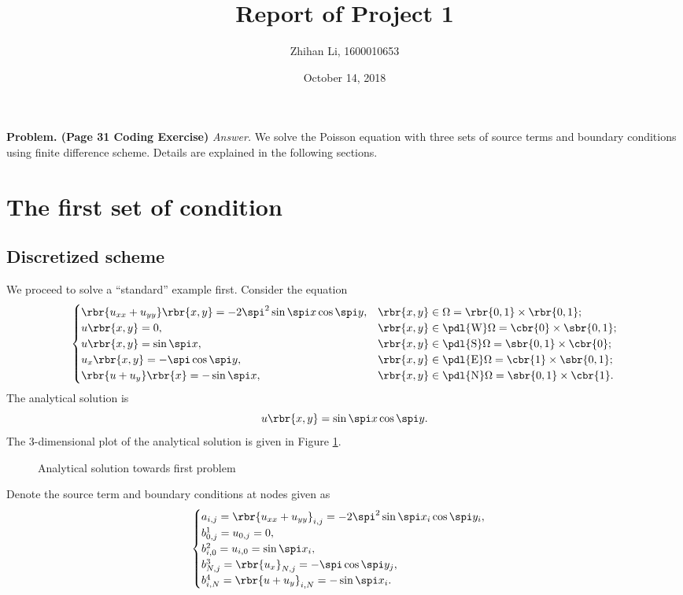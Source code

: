 \documentclass[english, nochinese]{pnote}
\title{Report of Project 1}
\author{Zhihan Li, 1600010653}
\date{October 14, 2018}
\begin{document}
\maketitle

\textbf{Problem. (Page 31 Coding Exercise)} \textit{Answer.} We solve the Poisson equation with three sets of source terms and boundary conditions using finite difference scheme. Details are explained in the following sections.

\section{The first set of condition}

\subsection{Discretized scheme}

We proceed to solve a ``standard'' example first. Consider the equation
\begin{equation}
\begin{cases}
\rbr{ u_{ x x } + u_{ y y } } \rbr{ x, y } = -2 \spi^2 \sin \spi x \cos \spi y, & \rbr{ x, y } \in \Omega = \rbr{ 0, 1 } \times \rbr{ 0, 1 }; \\
u \rbr{ x, y } = 0, & \rbr{ x, y } \in \pdl{\text{W}} \Omega = \cbr{0} \times \sbr{ 0, 1 }; \\
u \rbr{ x, y } = \sin \spi x, & \rbr{ x, y } \in \pdl{\text{S}} \Omega = \sbr{ 0, 1 } \times \cbr{0}; \\
u_x \rbr{ x, y } = -\spi \cos \spi y, & \rbr{ x, y } \in \pdl{\text{E}} \Omega = \cbr{1} \times \sbr{ 0, 1 }; \\
\rbr{ u + u_y } \rbr{x} = -\sin \spi x, & \rbr{ x, y } \in \pdl{\text{N}} \Omega = \sbr{ 0, 1 } \times \cbr{1}.
\end{cases}
\end{equation}
The analytical solution is
\begin{equation}
u \rbr{ x, y } = \sin \spi x \cos \spi y.
\end{equation}
The 3-dimensional plot of the analytical solution is given in Figure \ref{Fig:Prob13D}.
\begin{figure}[htbp]
\centering

\caption{Analytical solution towards first problem}
\label{Fig:Prob13D}
\end{figure}
Denote the source term and boundary conditions at nodes given as
\begin{gather}
\begin{cases}
a_{ i, j } = \rbr{ u_{ x x } + u_{ y y } }_{ i, j } = -2 \spi^2 \sin \spi x_i \cos \spi y_i, \\
b^1_{ 0, j } = u_{ 0, j } = 0, \\
b^2_{ i, 0 } = u_{ i, 0 } = \sin \spi x_i, \\
b^3_{ N, j } = \rbr{u_x}_{ N, j } = -\spi \cos \spi y_j, \\
b^4_{ i, N } = \rbr{ u + u_y }_{ i, N } = -\sin \spi x_i.
\end{cases}
\end{gather}
\end{document}

